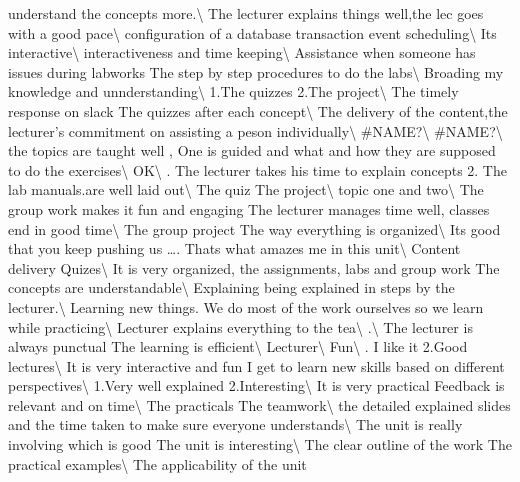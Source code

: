\documentclass[
]{article}
\begin{document}
understand the concepts more.\textbackslash{} \hline The lecturer
explains things well,the lec goes with a good pace\textbackslash{}
\hline configuration of a database transaction event
scheduling\textbackslash{} \hline Its interactive\textbackslash{} \hline
interactiveness and time keeping\textbackslash{} \hline Assistance when
someone has issues during labworks The step by step procedures to do the
labs\textbackslash{} \hline Broading my knowledge and
unnderstanding\textbackslash{} \hline 1.The quizzes 2.The
project\textbackslash{} \hline The timely response on slack The quizzes
after each concept\textbackslash{} \hline The delivery of the
content,the lecturer's commitment on assisting a peson
individually\textbackslash{} \hline \#NAME?\textbackslash{} \hline
\#NAME?\textbackslash{} \hline the topics are taught well , One is
guided and what and how they are supposed to do the
exercises\textbackslash{} \hline OK\textbackslash{} . The lecturer takes his time to explain concepts 2. The lab
manuals.are well laid out\textbackslash{} \hline The quiz The
project\textbackslash{} \hline topic one and two\textbackslash{} \hline
The group work makes it fun and engaging The lecturer manages time well,
classes end in good time\textbackslash{} \hline The group project The
way everything is organized\textbackslash{} \hline Its good that you
keep pushing us \ldots. Thats what amazes me in this
unit\textbackslash{} \hline Content delivery Quizes\textbackslash{}
\hline It is very organized, the assignments, labs and group work The
concepts are understandable\textbackslash{} \hline Explaining being
explained in steps by the lecturer.\textbackslash{} \hline Learning new
things. We do most of the work ourselves so we learn while
practicing\textbackslash{} \hline Lecturer explains everything to the
tea\textbackslash{} \hline .\textbackslash{} \hline The lecturer is
always punctual The learning is efficient\textbackslash{} \hline
Lecturer\textbackslash{} \hline Fun\textbackslash{} . I like it 2.Good lectures\textbackslash{} \hline It is very
interactive and fun I get to learn new skills based on different
perspectives\textbackslash{} \hline 1.Very well explained
2.Interesting\textbackslash{} \hline It is very practical Feedback is
relevant and on time\textbackslash{} \hline The practicals The
teamwork\textbackslash{} \hline the detailed explained slides and the
time taken to make sure everyone understands\textbackslash{} \hline The
unit is really involving which is good The unit is
interesting\textbackslash{} \hline The clear outline of the work The
practical examples\textbackslash{} \hline The applicability of the unit
\end{document}
